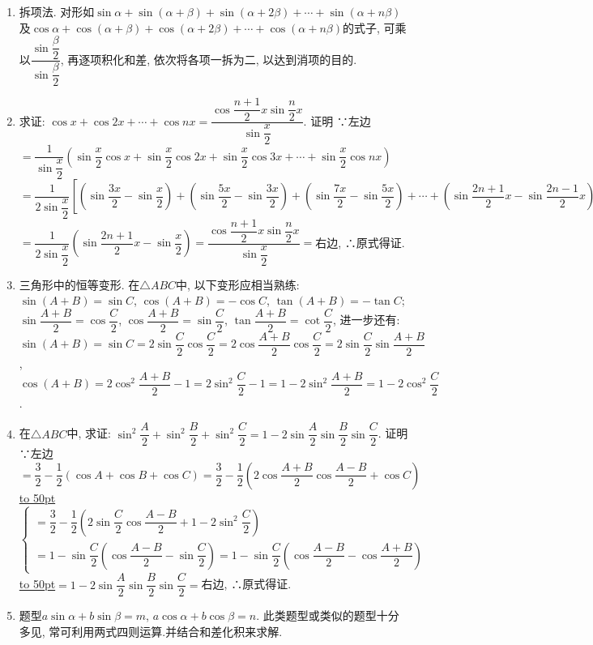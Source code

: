 \documentclass[10pt,a4paper]{article}
\newcommand{\blank}[1]{\underline{\hbox to #1pt{}}}
\begin{document}
\begin{enumerate}[1.]
(3)已知$\sin \alpha -\cos \alpha =\dfrac 12$, 且$\pi <\alpha <2\pi$, 求$\tan \dfrac{\alpha }2$的值.
(4)已知$\cos \alpha =-\dfrac 35$, 且$\alpha$为第二象限角, 求$\dfrac{\tan \dfrac{\pi +\alpha }4}{1-\cot ^2\dfrac{\pi -\alpha }4}$的值.
二、积化和差与和差化积公式
【典型题型和解题技巧】
\item 拆项法.
对形如$\sin \alpha +\sin (\alpha +\beta)+\sin (\alpha +2\beta)+\cdots +\sin (\alpha +n\beta)$及$\cos \alpha +\cos (\alpha +\beta)+\cos (\alpha +2\beta)+\cdots +\cos (\alpha +n\beta)$的式子, 可乘以$\dfrac{\sin \dfrac{\beta }2}{\sin \dfrac{\beta }2}$, 再逐项积化和差, 依次将各项一拆为二, 以达到消项的目的.
\item 求证: $\cos x+\cos 2x+\cdots +\cos nx=\dfrac{\cos \dfrac{n+1}2x\sin \dfrac n2x}{\sin \dfrac x2}$.
证明  ∵左边$=\dfrac 1{\sin \dfrac x2}(\sin \dfrac x2\cos x+\sin \dfrac x2\cos 2x+\sin \dfrac x2\cos 3x+\cdots +\sin \dfrac x2\cos nx)$
$=\dfrac 1{2\sin \dfrac x2}[(\sin \dfrac{3x}2-\sin \dfrac x2)+(\sin \dfrac{5x}2-\sin \dfrac{3x}2)+(\sin \dfrac{7x}2-\sin \dfrac{5x}2)+\cdots +(\sin \dfrac{2n+1}2x-\sin \dfrac{2n-1}2x)]$
$=\dfrac 1{2\sin \dfrac x2}(\sin \dfrac{2n+1}2x-\sin \dfrac x2)=\dfrac{\cos \dfrac{n+1}2x\sin \dfrac n2x}{\sin \dfrac x2}=$右边,
∴原式得证.
\item 三角形中的恒等变形.
在$\triangle ABC$中, 以下变形应相当熟练:
$\sin (A+B)=\sin C$, $\cos (A+B)=-\cos C$, $\tan (A+B)=-\tan C$;
$\sin \dfrac{A+B}2=\cos \dfrac C2$, $\cos \dfrac{A+B}2=\sin \dfrac C2$, $\tan \dfrac{A+B}2=\cot \dfrac C2$,
进一步还有: $\sin (A+B)=\sin C=2\sin \dfrac C2\cos \dfrac C2=2\cos \dfrac{A+B}2\cos \dfrac C2=2\sin \dfrac C2\sin \dfrac{A+B}2$,
$\cos (A+B)=2\cos ^2\dfrac{A+B}2-1=2\sin ^2\dfrac C2-1=1-2\sin ^2\dfrac{A+B}2=1-2\cos ^2\dfrac C2$.
\item 在$\triangle ABC$中, 求证: $\sin ^2\dfrac A2+\sin ^2\dfrac B2+\sin ^2\dfrac C2=1-2\sin \dfrac A2\sin \dfrac B2\sin \dfrac C2$.
证明  ∵左边$=\dfrac 32-\dfrac 12(\cos A+\cos B+\cos C)=\dfrac 32-\dfrac 12(2\cos \dfrac{A+B}2\cos \dfrac{A-B}2+\cos C)$
\blank{50}$\begin{cases} =\dfrac 32-\dfrac 12(2\sin \dfrac C2\cos \dfrac{A-B}2+1-2\sin ^2\dfrac C2) \\ =1-\sin \dfrac C2(\cos \dfrac{A-B}2-\sin \dfrac C2)=1-\sin \dfrac C2(\cos \dfrac{A-B}2-\cos \dfrac{A+B}2) \end{cases}$
\blank{50}$=1-2\sin \dfrac A2\sin \dfrac B2\sin \dfrac C2=$右边,
∴原式得证.
\item 题型$a\sin \alpha +b\sin \beta =m$, $a\cos \alpha +b\cos \beta =n$.
此类题型或类似的题型十分多见, 常可利用两式四则运算.并结合和差化积来求解.

\end{enumerate}
\end{document}

